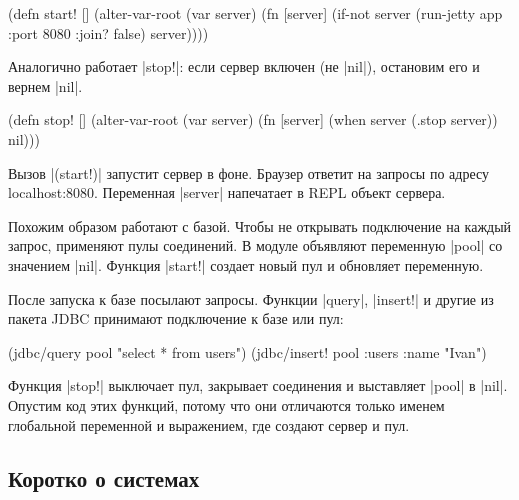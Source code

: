 \begin{english}
  \begin{clojure}
(defn start! []
  (alter-var-root
   (var server)
   (fn [server]
     (if-not server
       (run-jetty app {:port 8080 :join? false})
       server))))
  \end{clojure}
\end{english}

\noindent
Аналогично работает \spverb|stop!|: если сервер включен (не \spverb|nil|),
остановим его и вернем \spverb|nil|.

\begin{english}
  \begin{clojure}
(defn stop! []
  (alter-var-root
   (var server)
   (fn [server]
     (when server
       (.stop server))
     nil)))
  \end{clojure}
\end{english}

Вызов \spverb|(start!)| запустит сервер в фоне. Браузер ответит на запросы по
адресу localhost:8080. Переменная \spverb|server| напечатает в REPL объект
сервера.


Похожим образом работают с базой. Чтобы не открывать подключение на каждый
запрос, применяют пулы соединений. В модуле объявляют переменную \spverb|pool|
со значением \spverb|nil|. Функция \spverb|start!| создает новый пул и обновляет
переменную.


После запуска к базе посылают запросы. Функции \spverb|query|, \spverb|insert!|
и другие из пакета JDBC принимают подключение к базе или пул:

\begin{english}
  \begin{clojure}
(jdbc/query pool "select * from users")
(jdbc/insert! pool :users {:name "Ivan"})
  \end{clojure}
\end{english}

Функция \spverb|stop!| выключает пул, закрывает соединения и выставляет
\spverb|pool| в \spverb|nil|. Опустим код этих функций, потому что они
отличаются только именем глобальной переменной и выражением, где создают сервер
и пул.

\subsection{Коротко о системах}


